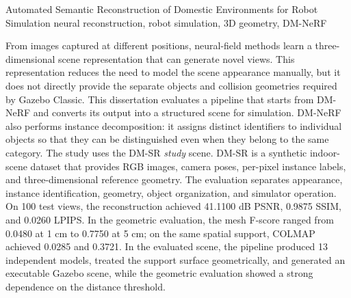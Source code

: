 \begin{englishabstract}%
  {Automated Semantic Reconstruction of Domestic Environments for Robot Simulation}%
  {neural reconstruction, robot simulation, 3D geometry, DM-NeRF}

From images captured at different positions, neural-field methods learn a three-dimensional scene representation that can generate novel views. This representation reduces the need to model the scene appearance manually, but it does not directly provide the separate objects and collision geometries required by Gazebo Classic. This dissertation evaluates a pipeline that starts from DM-NeRF and converts its output into a structured scene for simulation. DM-NeRF also performs instance decomposition: it assigns distinct identifiers to individual objects so that they can be distinguished even when they belong to the same category. The study uses the DM-SR \textit{study} scene. DM-SR is a synthetic indoor-scene dataset that provides RGB images, camera poses, per-pixel instance labels, and three-dimensional reference geometry. The evaluation separates appearance, instance identification, geometry, object organization, and simulator operation. On 100 test views, the reconstruction achieved 41.1100 dB PSNR, 0.9875 SSIM, and 0.0260 LPIPS. In the geometric evaluation, the mesh F-score ranged from 0.0480 at 1 cm to 0.7750 at 5 cm; on the same spatial support, COLMAP achieved 0.0285 and 0.3721. In the evaluated scene, the pipeline produced 13 independent models, treated the support surface geometrically, and generated an executable Gazebo scene, while the geometric evaluation showed a strong dependence on the distance threshold.
\renewcommand{\keywordsname}{Keywords}
\end{englishabstract}
